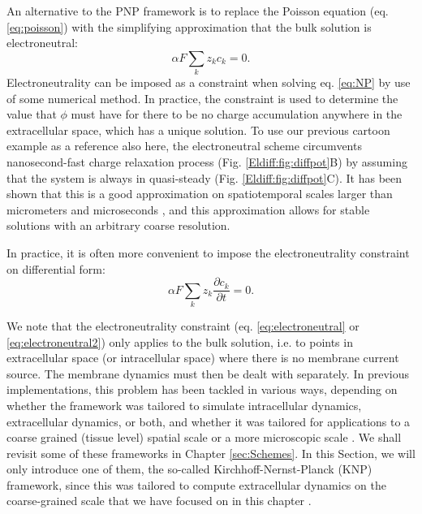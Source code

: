 \subsubsection{}
An alternative to the PNP framework is to replace the Poisson equation (eq. \ref{eq:poisson}) with the simplifying approximation that the bulk solution is electroneutral:
\begin{equation}
\alpha F \sum_k z_k c_k = 0.
\label{eq:electroneutral}
\end{equation}
Electroneutrality can be imposed as a constraint when solving eq. \ref{eq:NP} by use of some numerical method. In practice, the constraint is used to determine the value that $\phi$ must have for there to be no charge accumulation anywhere in the extracellular space, which has a unique solution. To use our previous cartoon example as a reference also here, the electroneutral scheme circumvents nanosecond-fast charge relaxation process (Fig. \ref{Eldiff:fig:diffpot}B) by assuming that the system is always in quasi-steady (Fig. \ref{Eldiff:fig:diffpot}C). It has been shown that this is a good approximation on spatiotemporal scales larger than micrometers and microseconds \citep{Grodzinsky2011, Pods2017, Solbra2018}, and this approximation allows for stable solutions with an arbitrary coarse resolution.

In practice, it is often more convenient to impose the electroneutrality constraint on differential form:
\begin{equation}
\alpha F \sum_k{z_k \frac{\partial c_k}{\partial t}} = 0.
\label{eq:electroneutral2}
\end{equation}

We note that the electroneutrality constraint (eq. \ref{eq:electroneutral} or \ref{eq:electroneutral2}) only applies to the bulk solution, i.e. to points in extracellular space (or intracellular space) where there is no membrane current source. The membrane dynamics must then be dealt with separately. In previous implementations, this problem has been tackled in various ways, depending on whether the framework was tailored to simulate intracellular dynamics, extracellular dynamics, or both, and whether it was tailored for applications to a coarse grained (tissue level) spatial scale or a more microscopic scale \citep{Mori2008, Mori2009, Mori2009a, Mori2011, Halnes2015, Halnes2013, Pods2017, Niederer2013, OConnell2016, Solbra2018, tuttle2019, ellingsrud2019}. We shall revisit some of these frameworks in Chapter \ref{sec:Schemes}. In this Section, we will only introduce one of them, the so-called Kirchhoff-Nernst-Planck (KNP) framework, since this was tailored to compute extracellular dynamics on the coarse-grained scale that we have focused on in this chapter \citep{Solbra2018}.


